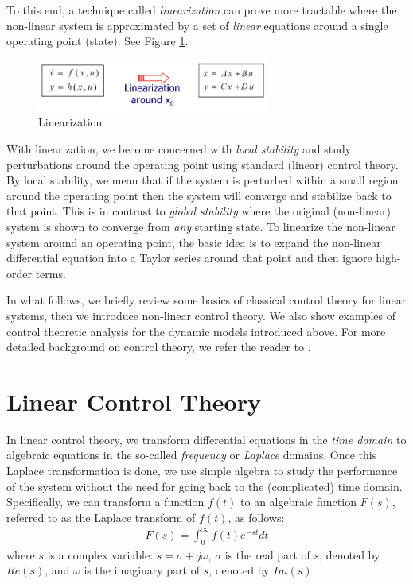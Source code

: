 \documentclass{article}
\begin{document}
To this end, a technique called {\em linearization} can prove more tractable
where the non-linear system is approximated by a set of {\em linear} equations around a single operating point (state).
See Figure \ref{fig:linearize}.
\begin{figure}[htbp]
   \centering
   \includegraphics[width=3in]{figures/linearize.jpg} %
   \caption{Linearization}
   \label{fig:linearize}
\end{figure}
With linearization, we become concerned with {\em local stability} and study perturbations around the operating point
using standard (linear) control theory. 
By local stability, we mean that if the system is perturbed within a small region around the operating point 
then the system will converge and stabilize back to that point.
This is in contrast to {\em global stability} where the original (non-linear) system is shown to 
converge from {\em any} starting state.
To linearize the non-linear system around an operating point,
the basic idea is to expand the non-linear differential equation into 
a Taylor series around that point and then ignore high-order terms.

In what follows, we briefly review some basics of classical control theory for linear systems,
then we introduce non-linear control theory. We also show examples of control theoretic analysis for 
the dynamic models introduced above.
For more detailed background on control theory,
we refer the reader to \cite{Ogata:2010,Keshav:2010,Lu:2001}.

\section{Linear Control Theory}  
\label{sec:linear}

In linear control theory, we transform differential equations in the {\em time domain} to algebraic equations in the so-called {\em frequency} or {\em Laplace} domains. Once this Laplace transformation is done, we use simple algebra to study the performance of the system without the need for going back to the (complicated) time domain. Specifically, we can transform a function $f(t)$ to an algebraic function $F(s)$, referred to as the Laplace transform of $f(t)$, as follows:
\begin{eqnarray*}
F(s) = \int_0^{\infty} f(t) e^{-st} dt
\end{eqnarray*}
where $s$ is a complex variable: $s = \sigma + j \omega$, $\sigma$ is the real part of $s$, denoted by $Re(s)$,
and $\omega$ is the imaginary part of $s$, denoted by $Im(s)$.
\end{document}
